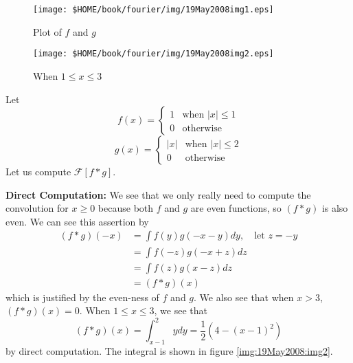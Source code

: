 \begin{ex}
\begin{figure}[ht!]
\texttt{[image: \$HOME/book/fourier/img/19May2008img1.eps]}
\caption{Plot of $f$ and $g$}
\end{figure}
\begin{figure}[hb!]
\texttt{[image: \$HOME/book/fourier/img/19May2008img2.eps]}
\caption{When $1\leq x\leq3$}\label{img:19May2008:img2}
\end{figure}
Let
\begin{equation*}
f(x) = \begin{cases}1 &\text{when }|x|\leq1\\
0&\text{otherwise}\end{cases}
\end{equation*}
\begin{equation*}
g(x) = \begin{cases}|x| &\text{when }|x|\leq2\\
0&\text{otherwise}\end{cases}
\end{equation*}
Let us compute $\mathcal{F}[f*g]$.

\textbf{Direct Computation:} We see that we only really need
to compute the convolution for $x\geq0$ because both $f$ and
$g$ are even functions, so $(f*g)$ is also even. We can see
this assertion by
\begin{align*}
(f*g)(-x) &= \int f(y)g(-x-y)dy,\quad\text{let }z=-y\\
&= \int f(-z)g(-x+z)dz\\
&= \int f(z)g(x-z)dz\\
&= (f*g)(x)
\end{align*}
which is justified by the even-ness of $f$ and $g$. We also
see that when $x>3$, $(f*g)(x)=0$.
When $1\leq x\leq 3$, we see that
\begin{equation}
(f*g)(x) = \int^{2}_{x-1}ydy = \frac{1}{2}(4-(x-1)^2)
\end{equation}
by direct computation. The integral is shown in figure \eqref{img:19May2008:img2}.


\end{ex}
